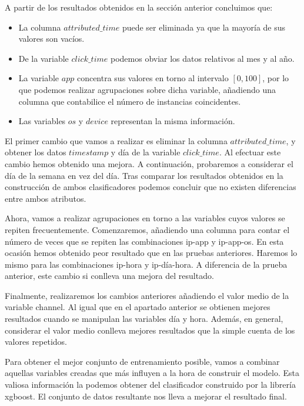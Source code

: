 A partir de los resultados obtenidos en la sección anterior concluimos que:

\begin{itemize}
	\item La columna $attributed\_time$ puede ser eliminada ya que la mayoría de sus valores son vacíos.
	\item De la variable $click\_time$ podemos obviar los datos relativos al mes y al año.
	\item La variable $app$ concentra sus valores en torno al intervalo $[0,100]$, por lo que podemos realizar agrupaciones sobre dicha variable, añadiendo una columna que contabilice el número de instancias coincidentes.
	\item Las variables $os$ y $device$ representan la misma información.
\end{itemize}

El primer cambio que vamos a realizar es eliminar la columna $attributed\_time$, y obtener los datos $timestamp$ y día de la variable $click\_time$. Al efectuar este cambio hemos obtenido una mejora. A continuación, probaremos a considerar el día de la semana en vez del día. Tras comparar los resultados obtenidos en la construcción de ambos clasificadores podemos concluir que no existen diferencias entre ambos atributos.

\medskip

Ahora, vamos a realizar agrupaciones en torno a las variables cuyos valores se repiten frecuentemente. Comenzaremos, añadiendo una columna para contar el número de veces que se repiten las combinaciones ip-app y ip-app-os. En esta ocasión hemos obtenido peor resultado que en las pruebas anteriores. Haremos lo mismo para las combinaciones ip-hora y ip-día-hora. A diferencia de la prueba anterior, este cambio si conlleva una mejora del resultado.

Finalmente, realizaremos los cambios anteriores añadiendo el valor medio de la variable channel. Al igual que en el apartado anterior se obtienen mejores resultados cuando se manipulan las variables día y hora. Además, en general, considerar el valor medio conlleva mejores resultados que la simple cuenta de los valores repetidos.
\bigskip

Para obtener el mejor conjunto de entrenamiento posible, vamos a combinar aquellas variables creadas que más influyen a la hora de construir el modelo. Esta valiosa información la podemos obtener del clasificador construido por la librería xgboost. 
El conjunto de datos resultante nos lleva a mejorar el resultado final.
 

